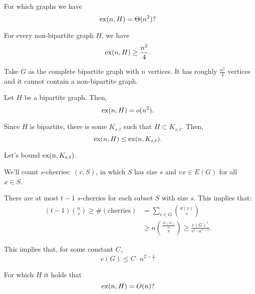 \begin{ques}
	For which graphs we have \[
		\operatorname{ex}(n, H) = \Theta(n^2)?
	\]
\end{ques}

\begin{prop}
	For every non-bipartite graph $H$, we have \[
		\operatorname{ex}(n, H) \ge \frac{n^2}{4}.
	\]
\end{prop}

\begin{dem}
	Take $G$ as the complete bipartite graph with $n$ vertices. It has roughly $\frac{n^2}{4}$ vertices and it cannot contain a non-bipartite graph.
\end{dem}

\begin{thm}\label{thm:kovari-sos-turan-1954}
	Let $H$ be a bipartite graph. Then, \[
		\operatorname{ex}(n, H) = o(n^2).
	\]
\end{thm}

\begin{dem}
	Since $H$ is bipartite, there is some $K_{s,t}$ such that $H \subset K_{s, t}$. Then, \[
		\operatorname{ex}(n, H) \le \operatorname{ex}(n, K_{s, t}).
	\]

	Let's bound $\operatorname{ex}(n, K_{s, t})$.

	We'll count $s$-cherries: $(v, S)$, in which $S$ has size $s$ and $vx \in E(G)$ for all $x \in S$.


	There are at most $t-1$ $s$-cherries for each subset $S$ with size $s$. This implies that:
	 \begin{align*}
		 (t-1)\binom{n}{s} \ge \#(\text{cherries}) &= \sum_{v \in G} \binom{d(v)}{s}\\
			&\ge n\binom{\frac{2e(G)}{n}}{s} \ge \frac{e(G)^s}{s^s\cdot n^{s-1}}.
	\end{align*}

	This implies that, for some constant $C$, \[
		e(G) \le C \cdot n^{2 - \frac{1}{s}}
	\]

\end{dem}

\begin{ques}
	For which $H$ it holds that \[
		\operatorname{ex}(n, H) = O(n)?
	\]
\end{ques}

